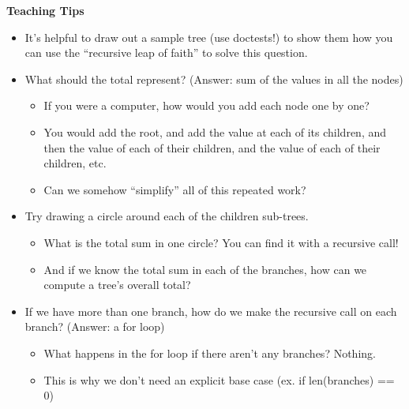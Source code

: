 \begin{guide}
	\begin{blocksection}
	\textbf{Teaching Tips}
	\begin{itemize}
			\item It’s helpful to draw out a sample tree (use doctests!) to show them how you can use the “recursive leap of faith” to solve this question.
			\item What should the total represent? (Answer: sum of the values in all the nodes)
			\begin{itemize}
                \item If you were a computer, how would you add each node one by one?
                \item You would add the root, and add the value at each of its children, and then the value of each of their children, and the value of each of their children, etc.
                \item Can we somehow “simplify” all of this repeated work?
            \end{itemize}
            \item Try drawing a circle around each of the children sub-trees.
            \begin{itemize}
                \item What is the total sum in one circle? You can find it with a recursive call!
                \item And if we know the total sum in each of the branches, how can we compute a tree's overall total?
            \end{itemize}
            \item If we have more than one branch, how do we make the recursive call on each branch? (Answer: a for loop)
            \begin{itemize}
                \item What happens in the for loop if there aren’t any branches? Nothing.
                \item This is why we don’t need an explicit base case (ex. if len(branches) == 0)
            \end{itemize}
	\end{itemize}
	\end{blocksection}
\end{guide}
